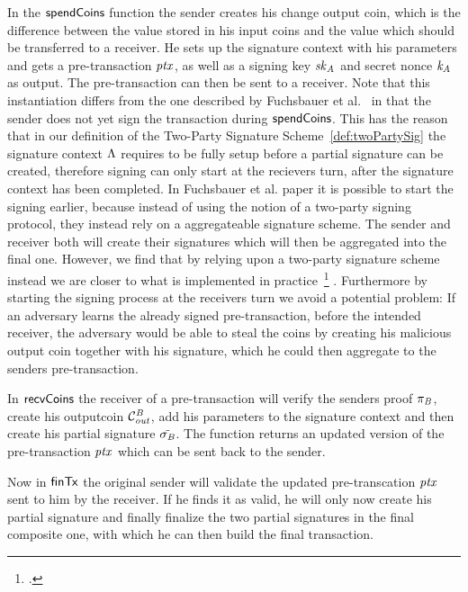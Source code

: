 In the $\mathsf{spendCoins}$ function the sender creates his change output coin, which is the difference between the value stored in his input coins and the value which should be transferred to a receiver.
He sets up the signature context with his parameters and gets a pre-transaction $\mathit{ptx}$, as well as a signing key $\mathit{sk}_{\mathit{A}}$ and secret nonce $\mathit{\mathit{k}_{\mathit{A}}}$ as output. The pre-transaction can then be sent to a receiver.
Note that this instantiation differs from the one described by Fuchsbauer et al.~\cite{fuchsbauer2019aggregate} in that the sender does not yet sign the transaction during $\mathsf{spendCoins}$. This has
the reason that in our definition of the Two-Party Signature Scheme~\ref{def:twoPartySig} the signature context $\Lambda$ requires to be fully setup before a partial signature can be created, therefore
signing can only start at the recievers turn, after the signature context has been completed. In Fuchsbauer et al. paper it is possible to start the signing earlier, because instead of using the notion
of a two-party signing protocol, they instead rely on a aggregateable signature scheme. The sender and receiver both will create their signatures which will then be aggregated into the final one. However,
we find that by relying upon a two-party signature scheme instead we are closer to what is implemented in practice~\footcite{https://medium.com/@brandonarvanaghi/grin-transactions-explained-step-by-step-fdceb905a853} .
Furthermore by starting the signing process at the receivers turn we avoid a potential problem: If an adversary learns the already signed pre-transaction, before the
intended receiver, the adversary would be able to steal the coins by creating his malicious output coin together with his signature, which he could then aggregate to the senders pre-transaction.

In $\mathsf{recvCoins}$ the receiver of a pre-transaction will verify the senders proof $\pi_{\mathit{B}}$, create his outputcoin $\mathcal{C}_{\mathit{out}}^{\mathit{B}}$, add his parameters to the signature context and then create his partial signature $\tilde{\sigma_{\mathit{B}}}$.
The function returns an updated version of the pre-transaction $\mathit{ptx}$ which can be sent back to the sender.

Now in $\mathsf{finTx}$ the original sender will validate the updated pre-transcation $\mathit{ptx}$ sent to him by the receiver. If he finds it as valid, he will only now create his partial signature and finally
finalize the two partial signatures in the final composite one, with which he can then build the final transaction.

